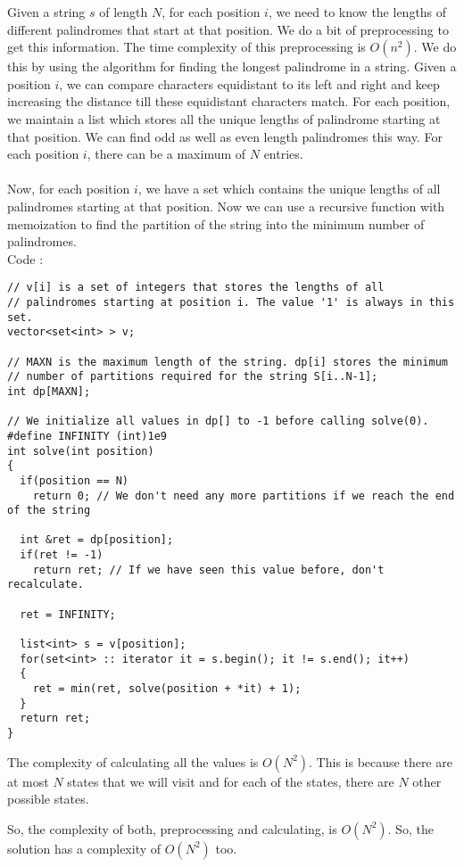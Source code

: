 \documentclass{article}
\begin{document}
Given a string $s$ of length $N$, for each position $i$, we need to know the lengths of different palindromes that start at that position. We do a bit of preprocessing to get this information. The time complexity of this preprocessing is $O(n^2)$. We do this by using the algorithm for finding the longest palindrome in a string. Given a position $i$, we can compare characters equidistant to its left and right and keep increasing the distance till these equidistant characters match. For each position, we maintain a list which stores all the unique lengths of palindrome starting at that position. We can find odd as well as even length palindromes this way. For each position $i$, there can be a maximum of $N$ entries. \\
\\
Now, for each position $i$, we have a set which contains the unique lengths of all palindromes starting at that position. Now we can use a recursive function with memoization to find the partition of the string into the minimum number of palindromes. 
\\
Code : 
\begin{verbatim}
// v[i] is a set of integers that stores the lengths of all 
// palindromes starting at position i. The value '1' is always in this set.
vector<set<int> > v; 

// MAXN is the maximum length of the string. dp[i] stores the minimum 
// number of partitions required for the string S[i..N-1];
int dp[MAXN]; 

// We initialize all values in dp[] to -1 before calling solve(0).
#define INFINITY (int)1e9
int solve(int position)
{
  if(position == N)
    return 0; // We don't need any more partitions if we reach the end of the string
	
  int &ret = dp[position];
  if(ret != -1)
    return ret; // If we have seen this value before, don't recalculate.
	
  ret = INFINITY;

  list<int> s = v[position];
  for(set<int> :: iterator it = s.begin(); it != s.end(); it++)
  {
    ret = min(ret, solve(position + *it) + 1);
  }
  return ret;
}
\end{verbatim}
The complexity of calculating all the values is $O(N^2)$. This is because there are at most $N$ states that we will visit and for each of the states, there are $N$ other possible states. 

So, the complexity of both, preprocessing and calculating, is $O(N^2)$. So, the solution has a complexity of $O(N^2)$ too. 

\clearpage
\end{document}
